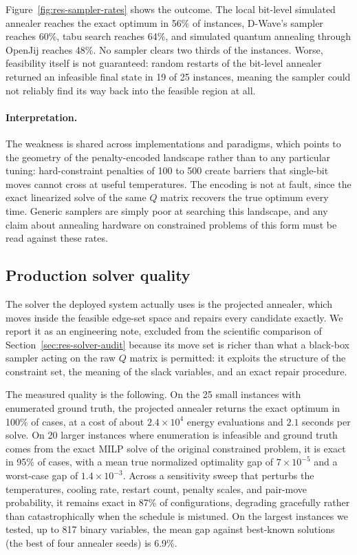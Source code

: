 Figure~\ref{fig:res-sampler-rates} shows the outcome. The local bit-level
simulated annealer reaches the exact optimum in 56\% of instances,
D-Wave's  sampler reaches 60\%, tabu search reaches 64\%, and
simulated quantum annealing through OpenJij reaches 48\%. No sampler
clears two thirds of the instances. Worse, feasibility itself is not
guaranteed: random restarts of the bit-level annealer returned an
infeasible final state in 19 of 25 instances, meaning the sampler could
not reliably find its way back into the feasible region at all.

\paragraph{Interpretation.}
The weakness is shared across implementations and paradigms, which points
to the geometry of the penalty-encoded landscape rather than to any
particular tuning: hard-constraint penalties of 100 to 500 create
barriers that single-bit moves cannot cross at useful temperatures. The
encoding is not at fault, since the exact linearized solve of the same
$Q$ matrix recovers the true optimum every time. Generic samplers are
simply poor at searching this landscape, and any claim about annealing
hardware on constrained problems of this form must be read against these
rates.

\subsection{Production solver quality}
\label{sec:res-projected}

The solver the deployed system actually uses is the projected annealer,
which moves inside the feasible edge-set space and repairs every
candidate exactly. We report it as an engineering note, excluded from the
scientific comparison of Section~\ref{sec:res-solver-audit} because its
move set is richer than what a black-box sampler acting on the raw $Q$
matrix is permitted: it exploits the structure of the constraint set, the
meaning of the slack variables, and an exact repair procedure.

The measured quality is the following. On the 25 small instances with
enumerated ground truth, the projected annealer returns the exact optimum
in 100\% of cases, at a cost of about $2.4 \times 10^{4}$ energy
evaluations and $2.1$ seconds per solve. On 20 larger instances where
enumeration is infeasible and ground truth comes from the exact MILP
solve of the original constrained problem, it is exact in 95\% of cases,
with a mean true normalized optimality gap of $7 \times 10^{-5}$ and a
worst-case gap of $1.4 \times 10^{-3}$. Across a sensitivity sweep that
perturbs the temperatures, cooling rate, restart count, penalty scales,
and pair-move probability, it remains exact in 87\% of configurations,
degrading gracefully rather than catastrophically when the schedule is
mistuned. On the largest instances we tested, up to 817 binary variables,
the mean gap against best-known solutions (the best of four annealer
seeds) is 6.9\%.

